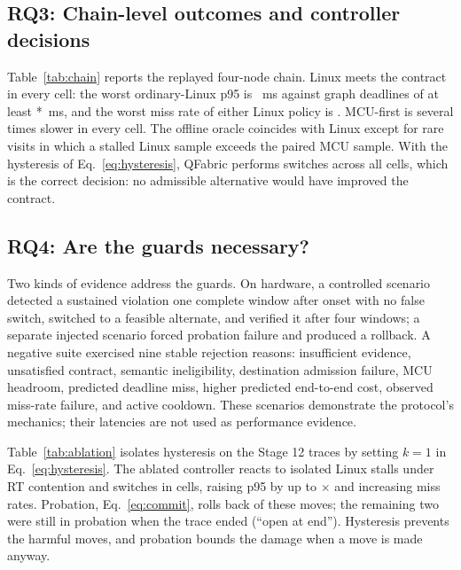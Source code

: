 \documentclass[conference]{IEEEtran}
\newcommand{\system}{QFabric\xspace}
\begin{document}
\subsection{RQ3: Chain-level outcomes and controller decisions}
\label{sec:chain}
Table~\ref{tab:chain} reports the replayed four-node chain. Linux meets the
contract in every cell: the worst ordinary-Linux p95 is
\StageTwelveWorstLinuxChainP~ms against graph deadlines of at least
\the{}*\StageTwelveMinNodeDeadline\relax~ms, and the worst miss rate
of either Linux policy is \StageTwelveWorstLinuxMiss. MCU-first is several
times slower in every cell. The offline oracle coincides with Linux except
for rare visits in which a stalled Linux sample exceeds the paired MCU sample.
With the hysteresis of Eq.~\eqref{eq:hysteresis}, \system performs
\StageTwelveSwitches{} switches across all \StageTwelveCells{} cells, which is
the correct decision: no admissible alternative would have improved the
contract.

\begin{table}[!tb]
\caption{Replayed four-node chain, \StageTwelveChainObservations{}
observations per cell; latencies in ms. $D_G$ is the graph deadline of
Eq.~\eqref{eq:deadline}. Neither \system recovery variant switched in any
cell.}
\label{tab:chain}
\centering
\scriptsize
\setlength{\tabcolsep}{2.6pt}

\end{table}

\subsection{RQ4: Are the guards necessary?}
\label{sec:guards}
Two kinds of evidence address the guards. On hardware, a controlled scenario
detected a sustained violation one complete window after onset with no false
switch, switched to a feasible alternate, and verified it after four windows;
a separate injected scenario forced probation failure and produced a
rollback. A negative suite exercised nine stable rejection reasons:
insufficient evidence, unsatisfied contract, semantic ineligibility,
destination admission failure, MCU headroom, predicted deadline miss, higher
predicted end-to-end cost, observed miss-rate failure, and active cooldown.
These scenarios demonstrate the protocol's mechanics; their latencies are
not used as performance evidence.

Table~\ref{tab:ablation} isolates hysteresis on the Stage 12 traces by
setting $k=1$ in Eq.~\eqref{eq:hysteresis}. The ablated controller reacts to
isolated Linux stalls under RT contention and switches in
\StageTwelveAblatedSwitches{} cells, raising p95 by up to
\StageTwelveAblationWorstRatio$\times$ and increasing miss rates. Probation,
Eq.~\eqref{eq:commit}, rolls back \StageTwelveAblatedRollbacks{} of these
moves; the remaining two were still in probation when the trace ended (``open at end'').
Hysteresis prevents the harmful moves, and probation bounds the damage when
a move is made anyway.
\end{document}
